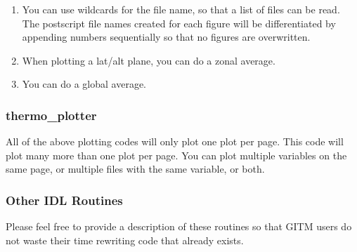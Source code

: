 \begin{enumerate}
	\item You can use wildcards for the file name, so that a list of files can be read.  The postscript file names created for each figure will be differentiated by appending numbers sequentially so that no figures are overwritten.
	\item When plotting a lat/alt plane, you can do a zonal average. 
	\item You can do a global average.
\end{enumerate}

\subsubsection{thermo\_plotter}

All of the above plotting codes will only plot one plot per page.  This code will plot many more than one plot per page.  You can plot multiple variables on the same page, or multiple files with the same variable, or both.

\subsubsection{Other IDL Routines}

Please feel free to provide a description of these routines so that GITM users do not waste their time rewriting code that already exists.

